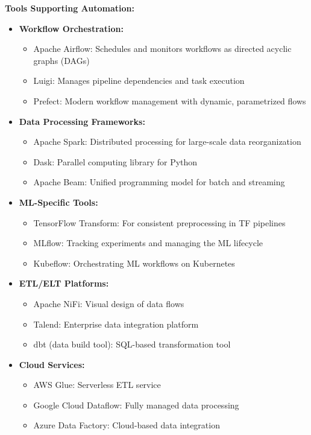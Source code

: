 \documentclass[12pt]{article}
\begin{document}
\begin{enumerate}
\begin{tcolorbox}[colback=blue!5!white,colframe=blue!75!black,title={Solution}]
    \textbf{Tools Supporting Automation:}
    \begin{itemize}
        \item \textbf{Workflow Orchestration:}
        \begin{itemize}
            \item Apache Airflow: Schedules and monitors workflows as directed acyclic graphs (DAGs)
            \item Luigi: Manages pipeline dependencies and task execution
            \item Prefect: Modern workflow management with dynamic, parametrized flows
        \end{itemize}
        
        \item \textbf{Data Processing Frameworks:}
        \begin{itemize}
            \item Apache Spark: Distributed processing for large-scale data reorganization
            \item Dask: Parallel computing library for Python
            \item Apache Beam: Unified programming model for batch and streaming
        \end{itemize}
        
        \item \textbf{ML-Specific Tools:}
        \begin{itemize}
            \item TensorFlow Transform: For consistent preprocessing in TF pipelines
            \item MLflow: Tracking experiments and managing the ML lifecycle
            \item Kubeflow: Orchestrating ML workflows on Kubernetes
        \end{itemize}
        
        \item \textbf{ETL/ELT Platforms:}
        \begin{itemize}
            \item Apache NiFi: Visual design of data flows
            \item Talend: Enterprise data integration platform
            \item dbt (data build tool): SQL-based transformation tool
        \end{itemize}
        
        \item \textbf{Cloud Services:}
        \begin{itemize}
            \item AWS Glue: Serverless ETL service
            \item Google Cloud Dataflow: Fully managed data processing
            \item Azure Data Factory: Cloud-based data integration
        \end{itemize}
    \end{itemize}
    

\end{tcolorbox}
\end{enumerate}
\end{document}
